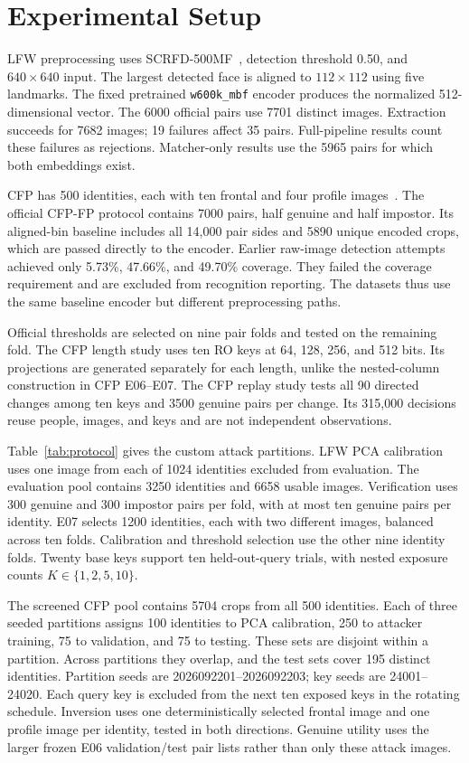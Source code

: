 \section{Experimental Setup}\label{sec:setup}


LFW preprocessing uses SCRFD-500MF~\cite{guo2021scrfd}, detection threshold 0.50, and $640\times640$ input. The largest detected face is aligned to $112\times112$ using five landmarks. The fixed pretrained \texttt{w600k\_mbf} encoder produces the normalized 512-dimensional vector. The 6000 official pairs use 7701 distinct images. Extraction succeeds for 7682 images; 19 failures affect 35 pairs. Full-pipeline results count these failures as rejections. Matcher-only results use the 5965 pairs for which both embeddings exist.

CFP has 500 identities, each with ten frontal and four profile images~\cite{sengupta2016cfp}. The official CFP-FP protocol contains 7000 pairs, half genuine and half impostor. Its aligned-bin baseline includes all 14,000 pair sides and 5890 unique encoded crops, which are passed directly to the encoder. Earlier raw-image detection attempts achieved only 5.73\%, 47.66\%, and 49.70\% coverage. They failed the coverage requirement and are excluded from recognition reporting. The datasets thus use the same baseline encoder but different preprocessing paths.

Official thresholds are selected on nine pair folds and tested on the remaining fold. The CFP length study uses ten RO keys at 64, 128, 256, and 512 bits. Its projections are generated separately for each length, unlike the nested-column construction in CFP E06--E07. The CFP replay study tests all 90 directed changes among ten keys and 3500 genuine pairs per change. Its 315,000 decisions reuse people, images, and keys and are not independent observations.


Table~\ref{tab:protocol} gives the custom attack partitions. LFW PCA calibration uses one image from each of 1024 identities excluded from evaluation. The evaluation pool contains 3250 identities and 6658 usable images. Verification uses 300 genuine and 300 impostor pairs per fold, with at most ten genuine pairs per identity. E07 selects 1200 identities, each with two different images, balanced across ten folds. Calibration and threshold selection use the other nine identity folds. Twenty base keys support ten held-out-query trials, with nested exposure counts $K\in\{1,2,5,10\}$.

The screened CFP pool contains 5704 crops from all 500 identities. Each of three seeded partitions assigns 100 identities to PCA calibration, 250 to attacker training, 75 to validation, and 75 to testing. These sets are disjoint within a partition. Across partitions they overlap, and the test sets cover 195 distinct identities. Partition seeds are 2026092201--2026092203; key seeds are 24001--24020. Each query key is excluded from the next ten exposed keys in the rotating schedule. Inversion uses one deterministically selected frontal image and one profile image per identity, tested in both directions. Genuine utility uses the larger frozen E06 validation/test pair lists rather than only these attack images.

